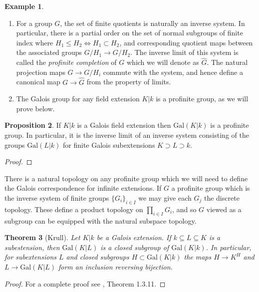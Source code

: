 \documentclass{article}
\newtheorem{theorem}{Theorem}[section]
\theoremstyle{definition}
\newtheorem{proposition}[theorem]{Proposition}
\newtheorem{example}[theorem]{Example}
\theoremstyle{remark}
\begin{document}
\begin{example} \text{}
\begin{enumerate}
	\item For a group $G$, the set of finite quotients is naturally an inverse system.
		In particular, there is a partial order on the set of normal subgroups of finite index where $H_1 \leq H_2 \Longleftrightarrow H_1 \subset H_2$, and corresponding quotient maps between the associated groups $G/H_1 \to G/H_2$.
		The inverse limit of this system is called the \textit{profinite completion} of $G$ which we will denote as $\widehat{G}$.	
		The natural projection maps $G \to G/H_i$ commute with the system, and hence define a canonical map $G \to \widehat{G}$ from the property of limits.
	\item The Galois group for any field extension $K|k$ is a profinite group, as we will prove below.
\end{enumerate}
\end{example}
\begin{proposition}
	If $K|k$ is a Galois field extension then $\text{Gal}(K|k)$ is a profinite group.
	In particular, it is the inverse limit of an inverse system consisting of the groups $\text{Gal}(L|k)$ for finite Galois subextensions $K \supset L \supset k$.
\end{proposition}
\begin{proof}
\end{proof}

	There is a natural topology on any profinite group which we will need to define the Galois correspondence for infinite extensions.
	If $G$ a profinite group which is the inverse system of finite groups $\{G_i\}_{i \in I}$ we may give each $G_j$ the discrete topology.
	These define a product topology on $\prod_{i \in I} G_i$, and so $G$ viewed as a subgroup can be equipped with the natural subspace topology.


\begin{theorem}[Krull]
	Let $K | k$ be a Galois extension.
	If $k \subseteq L \subseteq K$ is a subestension, then $\text{Gal}(K|L)$ is a closed subgroup of $\text{Gal}(K|k)$.
	In particular, for subextensions $L$ and closed subgroups $H \subset \text{Gal}(K|k)$ the maps $H \to K^H$ and $L \to \text{Gal}(K|L)$ form an inclusion reversing bijection.
\end{theorem}

\begin{proof}
	For a complete proof see \cite{Szamuely}, Theorem 1.3.11. 
\end{proof}
\end{document}
